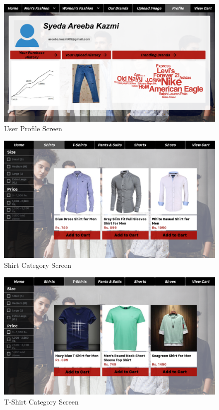   \begin{figure}[H]
  \includegraphics[width=15cm]{images/UserProfileScreen.pdf} 
  \centering
  \caption{User Profile Screen}
  \label{gui:profile}
  \end{figure}
  \begin{figure}[H]
  \includegraphics[width=15cm]{images/ShirtsScreen.pdf} 
  \centering
  \caption{Shirt Category Screen}
  \label{gui:product1}
  \end{figure}
  
  \begin{figure}[H]
  \includegraphics[width=15cm]{images/TShirtsScreen.pdf}
  \centering
  \caption{T-Shirt Category Screen}
  \label{gui:product2}
  \end{figure}
  
